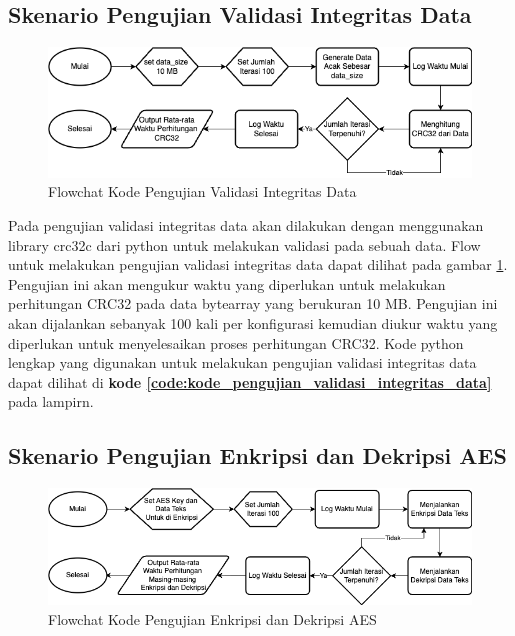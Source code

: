 \subsection{Skenario Pengujian Validasi Integritas Data}
\begin{figure}
    \centering
    \includegraphics[width=1\textwidth]
    {assets/pics/code-flowchart/flowchart_crc32.png}
    \caption{Flowchat Kode Pengujian Validasi Integritas Data}
    \label{fig:flowchart_crc32}
\end{figure}

Pada pengujian validasi integritas data akan dilakukan dengan menggunakan library crc32c dari python untuk melakukan validasi pada sebuah data. Flow untuk melakukan pengujian validasi integritas data dapat dilihat pada gambar \ref{fig:flowchart_crc32}. Pengujian ini akan mengukur waktu yang diperlukan untuk melakukan perhitungan CRC32 pada data bytearray yang berukuran 10 MB. Pengujian ini akan dijalankan sebanyak 100 kali per konfigurasi kemudian diukur waktu yang diperlukan untuk menyelesaikan proses perhitungan CRC32. Kode python lengkap yang digunakan untuk melakukan pengujian validasi integritas data dapat dilihat di \textbf{kode \ref{code:kode_pengujian_validasi_integritas_data}} pada lampirn.

\subsection{Skenario Pengujian Enkripsi dan Dekripsi AES}
\begin{figure}
    \centering
    \includegraphics[width=1\textwidth]
    {assets/pics/code-flowchart/flowchart_aes.png}
    \caption{Flowchat Kode Pengujian Enkripsi dan Dekripsi AES}
    \label{fig:flowchart_aes}
\end{figure}

